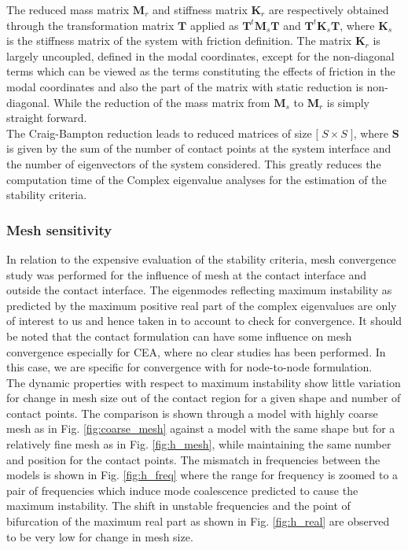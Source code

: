 The reduced mass matrix ${\bm  M}_{r}$ and stiffness matrix ${\bm  K}_{r}$ are respectively obtained through the transformation matrix ${\bm T}$ applied as ${\bm T}^t{\bm  M}_{s}{\bm T}$ and ${\bm T}^t{\bm  K}_{s}{\bm T}$, where ${\bm  K}_{s}$ is the stiffness matrix of the system with friction definition. The matrix ${\bm  K}_{r}$ is largely uncoupled, defined in the modal coordinates, except for the non-diagonal terms which can be viewed as the terms constituting the effects of friction in the modal coordinates and also the part of the matrix with static reduction is non-diagonal. While the reduction of the mass matrix from ${\bm  M}_{s}$ to ${\bm  M}_{r}$ is simply straight forward.\\

The Craig-Bampton reduction leads to reduced matrices of size ${\bm[\;S\times S\;]}$, where $\bm S$ is given by the sum of the number of contact points at the system interface and the number of eigenvectors of the system considered. This greatly reduces the computation time of the Complex eigenvalue analyses for the estimation of the stability criteria. \\

\fi


\subsubsection{Mesh sensitivity}

In relation to the expensive evaluation of the stability criteria, mesh convergence study was performed for the influence of mesh at the contact interface and outside the contact interface. The eigenmodes reflecting maximum instability as predicted by the maximum positive real part of the complex eigenvalues are only of interest to us and hence taken in to account to check for convergence. It should be noted that the contact formulation can have some influence on mesh convergence especially for CEA, where no clear studies has been performed. In this case, we are specific for convergence with for node-to-node formulation. \\

The dynamic properties with respect to maximum instability show little variation for change in mesh size out of the contact region for a given shape and number of contact points. The comparison is shown through a model with highly coarse mesh as in Fig. \ref{fig:coarse_mesh} against  a model with the same shape but for a relatively fine mesh as in Fig. \ref{fig:h_mesh}, while maintaining the same number and position for the contact points. The mismatch in frequencies between the models is shown in Fig. \ref{fig:h_freq} where the range for frequency is zoomed to a pair of frequencies which induce mode coalescence predicted to cause the maximum instability. The shift in unstable frequencies and the point of bifurcation of the maximum real part as shown in Fig. \ref{fig:h_real} are observed to be very low for change in mesh size.\\


